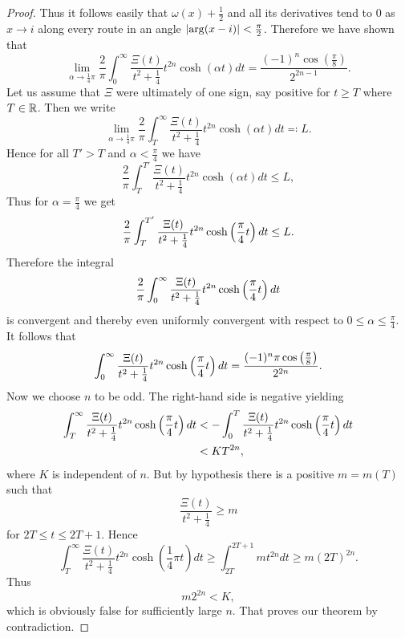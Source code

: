 \begin{proof}
	Thus it follows easily that $\omega(x) + \frac{1}{2}$ and all its derivatives tend to $0$ as $x \to i$ along every route in an angle $\left|\arg(x - i)\right| < \frac{\pi}{2}$. Therefore we have shown that
\begin{equation*}
	\lim _{\alpha \to \frac{1}{4} \pi} \frac{2}{\pi} \int _0 ^{\infty} \frac{\Xi(t)}{t^2 + \frac{1}{4}} t^{2n} \cosh(\alpha t) dt = \frac{(-1)^{n} \cos(\frac{\pi}{8})}{2^{2n - 1}}.
\end{equation*}
	Let us assume that $\Xi$ were ultimately of one sign, say positive for $t \geq T$ where $T \in \mathbb{R}$. Then we write
\begin{equation*}
	\lim _{\alpha \to \frac{1}{4} \pi} \frac{2}{\pi} \int _T ^{\infty} \frac{\Xi(t)}{t^2 + \frac{1}{4}} t^{2n} \cosh(\alpha t) dt \eqqcolon L.
\end{equation*}
	Hence for all $T' > T$ and $\alpha < \frac{\pi}{4}$ we have
\begin{equation*}
	\frac{2}{\pi} \int _T ^{T'} \frac{\Xi(t)}{t^2 + \frac{1}{4}} t^{2n} \cosh(\alpha t) dt \leq L,
\end{equation*}
	Thus for $\alpha = \frac{\pi}{4}$ we get
\begin{equation*}
	\frac{2}{\pi} \int _T ^{T'} \frac{\Xi(t)}{t^2 + \frac{1}{4}} t^{2n} \cosh\left(\frac{\pi}{4} t\right) dt \leq L.
\end{equation*}
	Therefore the integral
\begin{equation*}
	\frac{2}{\pi} \int _0 ^{\infty} \frac{\Xi(t)}{t^2 + \frac{1}{4}} t^{2n} \cosh\left(\frac{\pi}{4} t\right) dt
\end{equation*}
	is convergent and thereby even uniformly convergent with respect to $0 \leq \alpha \leq \frac{\pi}{4}$. It follows that
\begin{equation*}
	\int _0 ^{\infty} \frac{\Xi(t)}{t^2 + \frac{1}{4}} t^{2n} \cosh\left(\frac{\pi}{4} t\right) dt = \frac{(-1)^{n} \pi \cos\left(\frac{\pi}{8}\right)}{2^{2n}}.
\end{equation*}
	Now we choose $n$ to be odd. The right-hand side is negative yielding
\begin{equation*}
\begin{aligned}
	\int _T ^{\infty} \frac{\Xi(t)}{t^2 + \frac{1}{4}} t^{2n} \cosh\left(\frac{\pi}{4} t\right) dt 
		&< - \int _0 ^{T} \frac{\Xi(t)}{t^2 + \frac{1}{4}} t^{2n} \cosh\left(\frac{\pi}{4} t\right) dt \\
		&< KT^{2n},
\end{aligned}
\end{equation*}
	where $K$ is independent of $n$. But by hypothesis there is a positive $m = m(T)$ such that
\begin{equation*}
	\frac{\Xi(t)}{t^2 + \frac{1}{4}} \geq m
\end{equation*}
	for $2T \leq t \leq 2T + 1$. Hence
\begin{equation*}
	\int _T ^{\infty} \frac{\Xi(t)}{t^2 + \frac{1}{4}} t^{2n} \cosh(\frac{1}{4} \pi t) dt \geq \int _{2T} ^{2T + 1} mt^{2n} dt \geq m(2T)^{2n}.
\end{equation*}
	Thus
\begin{equation*}
	m2^{2n} < K,
\end{equation*}
	which is obviously false for sufficiently large $n$. That proves our theorem by contradiction.
\end{proof}